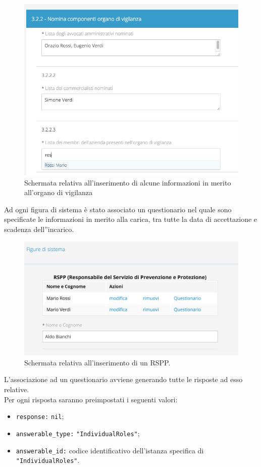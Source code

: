 	\begin{figure}[H]
		\begin{center}
			\includegraphics[width=12cm]{Pics/screen_organo_di_vigianza_con_autocompletamento.png}
			\caption{
				Schermata relativa all'inserimento di alcune informazioni in merito all'organo di vigilanza}
			\label{fig:ScreenOrganodiVigilanza}
		\end{center}
	\end{figure}
	
	Ad ogni figura di sistema è stato associato un questionario nel quale sono specificate le informazioni in merito alla carica, tra tutte la data di accettazione e scadenza dell''incarico.
	\begin{figure}[H]
		\begin{center}
			\includegraphics[width=12cm]{Pics/RemoteTrueRSPP.png}
			\caption{
				Schermata relativa all'inserimento di un RSPP.}
			\label{fig:ScreenRSPP}
		\end{center}
	\end{figure}	
	  L'associazione ad un questionario avviene generando tutte le risposte ad esso relative.\\
	  Per ogni risposta saranno preimpostati i seguenti valori:
	  \begin{itemize}
		  \item \texttt{response:} \texttt{nil};
		  \item \texttt{answerable\_type:} \texttt{"IndividualRoles"};
		  \item \texttt{answerable\_id:} codice identificativo dell'istanza specifica di \texttt{"IndividualRoles"}.
	  \end{itemize}

